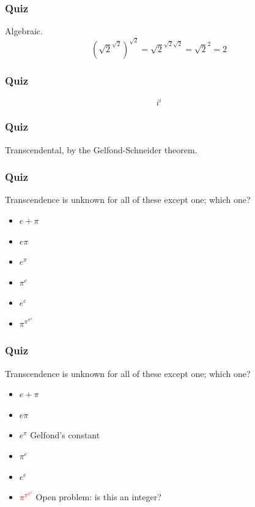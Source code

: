 \documentclass{beamer}
\begin{document}
    \begin{frame}
        \frametitle{Quiz}
        \begin{center}
            Algebraic. \[ {\left(\sqrt{2}^{\sqrt{2}}\right)}^{\sqrt{2}} = {\sqrt{2}}^{\sqrt{2} \sqrt{2}} = {\sqrt{2}}^{2} = 2 \]
        \end{center}
    \end{frame}

  
    \begin{frame}
        \frametitle{Quiz}
        \begin{center} 
            \[ {i}^{i} \]
        \end{center}
    \end{frame}

    \begin{frame}
        \frametitle{Quiz}
        \begin{center}
            Transcendental, by the Gelfond-Schneider theorem.
        \end{center}
    \end{frame}

    \begin{frame}
        \frametitle{Quiz}
        Transcendence is \alert{unknown} for all of these except one; which one?
        \begin{center}
            \begin{itemize}
                \item{$e+\pi$}
                \item{$e \pi$}
                \item{$e^{\pi}$}
                \item{${\pi}^{e}$}
                \item{${e}^{e}$}
                \item{${\pi}^{{\pi^{\pi^{\pi}}}}$}
            \end{itemize}
        \end{center}
    \end{frame}


     \begin{frame}
        \frametitle{Quiz}
        Transcendence is \alert{unknown} for all of these except one; which one?
        \begin{center}
            \begin{itemize}
                \item{$e+\pi$}
                \item{$e \pi$}
                \item{\textcolor{g1}{$e^{\pi}$} Gelfond's constant}
                \item{${\pi}^{e}$}
                \item{${e}^{e}$}
                \item{\textcolor{red}{${\pi}^{{\pi^{\pi^{\pi}}}}$} Open problem: is this an integer?}
            \end{itemize}
        \end{center}
    \end{frame}
\end{document}
